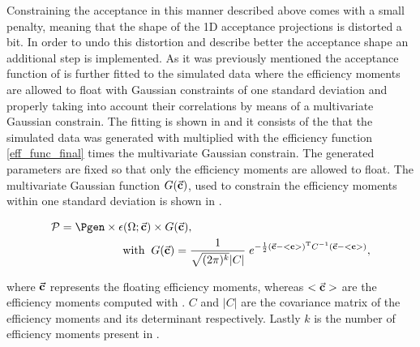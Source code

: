 Constraining the acceptance in this manner described above comes with a small penalty, meaning that the shape of the 1D acceptance
projections is distorted a bit. In order to undo this distortion and describe better the acceptance shape an additional step is implemented.
As it was previously mentioned the acceptance function of  is further fitted to the simulated data where the efficiency
moments are allowed to float with Gaussian constraints of one standard deviation and properly taking into account their correlations by
means of a multivariate Gaussian constrain. The fitting \pdf is shown in  and it consists of the \pdf that the simulated
data was generated with multiplied with the efficiency function \eqref{eff_func_final} times the multivariate Gaussian constrain.
The generated parameters are fixed so that only the efficiency moments are allowed to float.
The multivariate Gaussian function $G(\vec{\bf{c}})$, used to constrain the efficiency moments within one standard deviation is shown in .

\begin{center}
\begin{align}
  \mathcal{P}= \Pgen \times\epsilon(\Omega;\vec{\bf c})&  \times G(\vec{\bf{c}}), \nonumber\\
  \text{with} \;\; & G(\vec{\bf{c}}) = \frac{1}{\sqrt{(2\pi)^k}|C|} \; e^{-\frac{1}{2}(  \vec{\bf{c}} - <{\bf{c}}>  )^{\text{T}} C^{-1} (\vec{\bf{c}} - <{\bf{c}}> ) },
  \label{mvm_constr}
\end{align}
\end{center}

\noindent where $\vec{\bf c}$ represents the floating efficiency moments, whereas $<\vec{\bf c}>$ are the efficiency moments computed
with . $C$ and $|C|$ are the covariance matrix of the efficiency moments and its determinant respectively.
Lastly $k$ is the number of efficiency moments present in .

